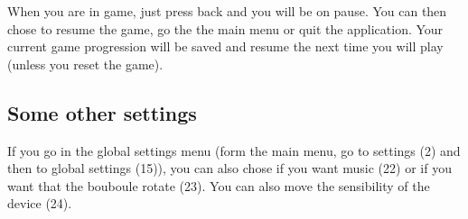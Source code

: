 \documentclass[a4paper,10pt]{report}
\begin{document}
	When you are in game, just press back and you will be on pause. You can then chose to resume the game, go the the main menu or quit the application. Your current game progression will be saved and resume the next time you will play (unless you reset the game).
	
	\subsection*{Some other settings}

	If you go in the global settings menu (form the main menu, go to settings (2) and then to global settings (15)), you can also chose if you want music (22) or if you want that the bouboule rotate (23). You can also move the sensibility of the device (24).
\end{document}
